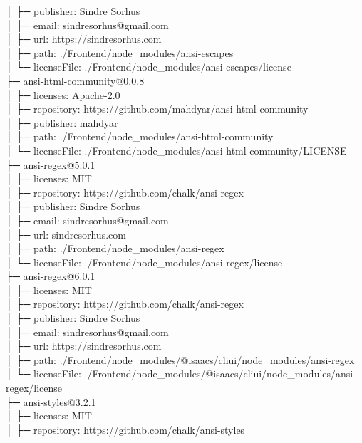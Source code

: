 \documentclass[
    paper=a4,
    twoside=false,
    parskip=half,
    listof=entryprefix,
    listof=totoc,
    index=totoc,
    bibliography=totoc,
    headsepline,
]{scrbook}
\begin{document}
    │  ├─ publisher: Sindre Sorhus\\
    │  ├─ email: sindresorhus@gmail.com\\
    │  ├─ url: https://sindresorhus.com\\
    │  ├─ path: ./Frontend/node\_modules/ansi-escapes\\
    │  └─ licenseFile: ./Frontend/node\_modules/ansi-escapes/license\\
    ├─ ansi-html-community@0.0.8\\
    │  ├─ licenses: Apache-2.0\\
    │  ├─ repository: https://github.com/mahdyar/ansi-html-community\\
    │  ├─ publisher: mahdyar\\
    │  ├─ path: ./Frontend/node\_modules/ansi-html-community\\
    │  └─ licenseFile: ./Frontend/node\_modules/ansi-html-community/LICENSE\\
    ├─ ansi-regex@5.0.1\\
    │  ├─ licenses: MIT\\
    │  ├─ repository: https://github.com/chalk/ansi-regex\\
    │  ├─ publisher: Sindre Sorhus\\
    │  ├─ email: sindresorhus@gmail.com\\
    │  ├─ url: sindresorhus.com\\
    │  ├─ path: ./Frontend/node\_modules/ansi-regex\\
    │  └─ licenseFile: ./Frontend/node\_modules/ansi-regex/license\\
    ├─ ansi-regex@6.0.1\\
    │  ├─ licenses: MIT\\
    │  ├─ repository: https://github.com/chalk/ansi-regex\\
    │  ├─ publisher: Sindre Sorhus\\
    │  ├─ email: sindresorhus@gmail.com\\
    │  ├─ url: https://sindresorhus.com\\
    │  ├─ path: ./Frontend/node\_modules/@isaacs/cliui/node\_modules/ansi-regex\\
    │  └─ licenseFile: ./Frontend/node\_modules/@isaacs/cliui/node\_modules/ansi-regex/license\\
    ├─ ansi-styles@3.2.1\\
    │  ├─ licenses: MIT\\
    │  ├─ repository: https://github.com/chalk/ansi-styles\\
\end{document}
